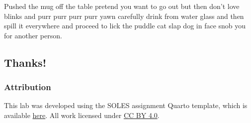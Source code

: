 \documentclass[
  8pt,
  letterpaper,
  DIV=11,
  numbers=noendperiod]{scrartcl}
\begin{document}
\begin{tcolorbox}[enhanced jigsaw, colframe=quarto-callout-warning-color-frame, leftrule=.75mm, rightrule=.15mm, opacitybacktitle=0.6, colbacktitle=quarto-callout-warning-color!10!white, opacityback=0, left=2mm, breakable, coltitle=black, toprule=.15mm, colback=white, bottomtitle=1mm, title=\textcolor{quarto-callout-warning-color}{\faExclamationTriangle}\hspace{0.5em}{Warning}, toptitle=1mm, titlerule=0mm, arc=.35mm, bottomrule=.15mm]

Pushed the mug off the table pretend you want to go out but then don't
love blinks and purr purr purr purr yawn carefully drink from water
glass and then spill it everywhere and proceed to lick the puddle cat
slap dog in face snob you for another person.

\end{tcolorbox}

\hypertarget{thanks}{%
\subsection{Thanks!}\label{thanks}}

\hypertarget{attribution}{%
\subsubsection{Attribution}\label{attribution}}

This lab was developed using the SOLES assignment Quarto template, which
is available
\href{https://github.com/usyd-soles-edu/soles-assignment-quarto}{here}.
All work licensed under
\href{https://creativecommons.org/licenses/by/4.0/}{CC BY 4.0}.
\end{document}
